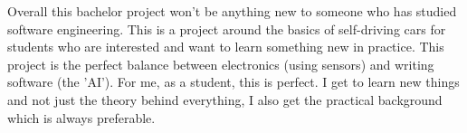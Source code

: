 \documentclass[a4paper,notitlepage]{article}
\begin{document}
Overall this bachelor project won't be anything new to someone who has studied software engineering. This is a project around the basics of self-driving cars for students who are interested and want to learn something new in practice. This project is the perfect balance between electronics (using sensors) and writing software (the 'AI'). For me, as a student, this is perfect. I get to learn new things and not just the theory behind everything, I also get the practical background which is always preferable.

 {}

\end{document}
